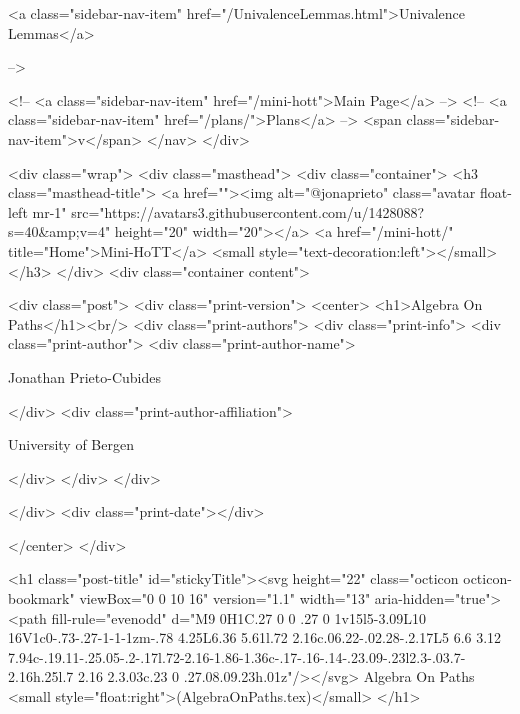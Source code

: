           <a class="sidebar-nav-item" href="/UnivalenceLemmas.html">Univalence Lemmas</a>
        
      
     -->

    <!-- <a class="sidebar-nav-item" href="/mini-hott">Main Page</a> -->
    <!-- <a class="sidebar-nav-item" href="/plans/">Plans</a> -->
    <span class="sidebar-nav-item">v</span>
  </nav>
</div>

    <div class="wrap">
      <div class="masthead">
        <div class="container">
          <h3 class="masthead-title">
            <a href=""><img alt="@jonaprieto" class="avatar float-left mr-1" src="https://avatars3.githubusercontent.com/u/1428088?s=40&amp;v=4" height="20" width="20"></a>
            <a href="/mini-hott/" title="Home">Mini-HoTT</a>
            <small style="text-decoration:left"></small>
          </h3>
        </div>
      <div class="container content">
        







<div class="post">
  <div class="print-version">
    <center>
      <h1>Algebra On Paths</h1><br/>
        <div class="print-authors">
          <div class="print-info">
            <div class="print-author">
              <div class="print-author-name">
                
                  Jonathan Prieto-Cubides
                
              </div>
              <div class="print-author-affiliation">
                
                  University of Bergen
                
                </div>
            </div>
          </div>
          
          
        </div>
        <div class="print-date"></div>
        
        
    </center>
  </div>

  

  <h1 class="post-title" id="stickyTitle"><svg height="22" class="octicon octicon-bookmark" viewBox="0 0 10 16" version="1.1" width="13" aria-hidden="true"><path fill-rule="evenodd" d="M9 0H1C.27 0 0 .27 0 1v15l5-3.09L10 16V1c0-.73-.27-1-1-1zm-.78 4.25L6.36 5.61l.72 2.16c.06.22-.02.28-.2.17L5 6.6 3.12 7.94c-.19.11-.25.05-.2-.17l.72-2.16-1.86-1.36c-.17-.16-.14-.23.09-.23l2.3-.03.7-2.16h.25l.7 2.16 2.3.03c.23 0 .27.08.09.23h.01z"/></svg> Algebra On Paths <small style="float:right">(AlgebraOnPaths.tex)</small>
  </h1>

